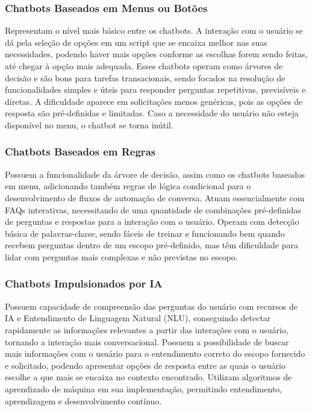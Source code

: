 \subsubsection{Chatbots Baseados em Menus ou Botões}
Representam o nível mais básico entre os chatbots. A interação com o usuário se dá pela seleção de opções em um script que se encaixa melhor nas suas necessidades, podendo haver mais opções conforme as escolhas forem sendo feitas, até chegar à opção mais adequada. Esses chatbots operam como árvores de decisão e são bons para tarefas transacionais, sendo focados na resolução de funcionalidades simples e úteis para responder perguntas repetitivas, previsíveis e diretas. A dificuldade aparece em solicitações menos genéricas, pois as opções de resposta são pré-definidas e limitadas. Caso a necessidade do usuário não esteja disponível no menu, o chatbot se torna inútil.

\subsubsection{Chatbots Baseados em Regras}
Possuem a funcionalidade da árvore de decisão, assim como os chatbots baseados em menu, adicionando também regras de lógica condicional para o desenvolvimento de fluxos de automação de conversa. Atuam essencialmente com FAQs interativas, necessitando de uma quantidade de combinações pré-definidas de perguntas e respostas para a interação com o usuário. Operam com detecção básica de palavras-chave, sendo fáceis de treinar e funcionando bem quando recebem perguntas dentro de um escopo pré-definido, mas têm dificuldade para lidar com perguntas mais complexas e não previstas no escopo.

\subsubsection{Chatbots Impulsionados por IA}
Possuem capacidade de compreensão das perguntas do usuário com recursos de IA e Entendimento de Linguagem Natural (NLU), conseguindo detectar rapidamente as informações relevantes a partir das interações com o usuário, tornando a interação mais conversacional. Possuem a possibilidade de buscar mais informações com o usuário para o entendimento correto do escopo fornecido e solicitado, podendo apresentar opções de resposta entre as quais o usuário escolhe a que mais se encaixa no contexto encontrado. Utilizam algoritmos de aprendizado de máquina em sua implementação, permitindo entendimento, aprendizagem e desenvolvimento contínuo.


